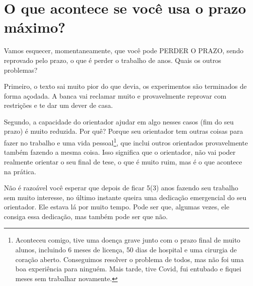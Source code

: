

\section{O que acontece se você usa o prazo máximo?}

Vamos esquecer, momentaneamente, que você pode PERDER O PRAZO, sendo reprovado pelo prazo, o que é perder o trabalho de anos. Quais os outros problemas?

Primeiro, o texto sai muito pior do que devia, os experimentos são terminados de forma açodada. A banca vai reclamar muito e provavelmente reprovar com restrições e te dar um dever de casa.

Segundo, a capacidade do orientador ajudar em algo nesses casos (fim do seu prazo) é muito reduzida. Por quê? Porque seu orientador tem outras coisas para fazer no trabalho e uma vida pessoal\footnote{Aconteceu comigo, tive uma doença grave junto com o prazo final de muito alunos, incluindo 6 meses de licença, 50  dias de hospital e uma cirurgia de coração aberto. Conseguimos resolver o problema de todos, mas não foi uma boa experiência para ninguém. Mais tarde, tive Covid, fui entubado e fiquei meses sem trabalhar novamente.}, que inclui outros orientados provavelmente também fazendo a mesma coisa.
Isso significa que o orientador, não vai poder realmente orientar o seu final de tese, o que é muito ruim, mas é o que acontece na prática.

Não é razoável você esperar que depois de ficar 5(3) anos fazendo seu trabalho sem muito interesse, no último instante queira uma dedicação emergencial do seu orientador. 
Ele estava lá por muito tempo. Pode ser que, algumas vezes, ele consiga essa dedicação, mas também pode ser que não.

